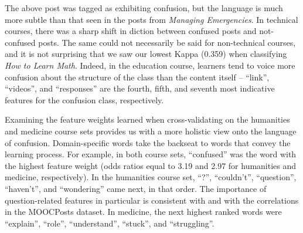 \documentclass{edm_template}
\begin{document}
The above post was tagged as exhibiting confusion, but the language is much more subtle than that seen in the posts from \emph{Managing Emergencies}. In technical courses, there was a sharp shift in diction between confused posts and not-confused posts. The same could not necessarily be said for non-technical courses, and it is not surprising that we saw our lowest Kappa (0.359) when classifying \emph{How to Learn Math}. Indeed, in the education course, learners tend to voice more confusion about the structure of the class than the content itself -- ``link'', ``videos'', and ``responses'' are the fourth, fifth, and seventh most indicative features for the confusion class, respectively.

Examining the feature weights learned when cross-validating on the humanities and medicine course sets provides us with a more holistic view onto the language of confusion. Domain-specific words take the backseat to words that convey the learning process. For example, in both course sets, ``confused'' was the word with the highest feature weight (odds ratios equal to 3.19 and 2.97 for humanities and medicine, respectively). In the humanities course set, ``?'', ``couldn't'', ``question'', ``haven't'', and ``wondering'' came next, in that order. The importance of question-related features in particular is consistent with \cite{wilson1989learning} and with the correlations in the MOOCPosts dataset. In medicine, the next highest ranked words were ``explain'', ``role'', ``understand'', ``stuck'', and ``struggling''.
\end{document}
